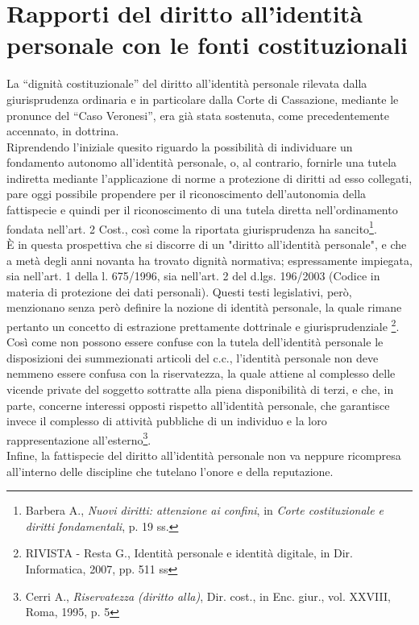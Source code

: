 \section{Rapporti del diritto all'identità personale con le fonti costituzionali}
La “dignità costituzionale” del diritto all’identità personale rilevata dalla giurisprudenza ordinaria e in particolare dalla Corte di Cassazione, mediante le pronunce del “Caso Veronesi”, era già stata sostenuta, come precedentemente accennato, in dottrina. 
\\Riprendendo l'iniziale quesito riguardo la possibilità di individuare un fondamento autonomo all’identità personale, o, al contrario, fornirle una tutela indiretta mediante l'applicazione di norme a protezione di diritti ad esso collegati, pare oggi possibile propendere per il riconoscimento dell’autonomia della fattispecie e quindi per il riconoscimento di una tutela diretta nell’ordinamento fondata nell’art. 2 Cost., così come la riportata giurisprudenza ha sancito\footnote{Barbera A., \textit{Nuovi diritti: attenzione ai confini}, in \textit{Corte costituzionale e diritti fondamentali}, p. 19 ss.}. 
\\È in questa prospettiva che si discorre di un "diritto all'identità personale", e che a metà degli anni novanta ha trovato dignità normativa; espressamente impiegata, sia nell'art. 1 della l. 675/1996, sia nell'art. 2 del d.lgs. 196/2003 (Codice in materia di protezione dei dati personali). Questi testi  legislativi, però, menzionano senza però definire la nozione di identità personale, la quale rimane pertanto un concetto di estrazione prettamente dottrinale e giurisprudenziale \footnote{RIVISTA - Resta G., Identità personale e identità digitale, in Dir. Informatica, 2007, pp. 511 ss}. 
\\Così come non possono essere confuse con la tutela dell'identità personale le disposizioni dei summezionati articoli del c.c., l’identità personale non deve nemmeno essere confusa con la riservatezza, la quale attiene al complesso delle vicende private del soggetto sottratte alla piena disponibilità di terzi, e che, in parte, concerne interessi opposti rispetto all’identità personale, che garantisce invece il complesso di attività pubbliche di un individuo e la loro rappresentazione all'esterno\footnote{Cerri A., \textit{Riservatezza (diritto alla)}, Dir. cost., in Enc. giur., vol. XXVIII, Roma, 1995, p. 5}.
\\Infine, la fattispecie del diritto all’identità personale non va neppure ricompresa all’interno delle discipline che tutelano l’onore e della reputazione.

